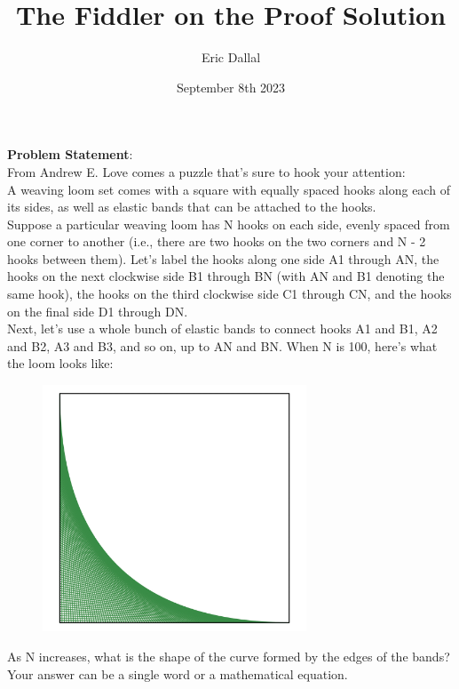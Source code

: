\documentclass[10pt,a4paper]{article}
\title{The Fiddler on the Proof Solution}
\date{September 8th 2023}
\author{Eric Dallal}
\begin{document}
\maketitle
\textbf{Problem Statement}:\\

From Andrew E. Love comes a puzzle that’s sure to hook your attention:\\

A weaving loom set comes with a square with equally spaced hooks along each of its sides, as well as elastic bands that can be attached to the hooks.\\

Suppose a particular weaving loom has N hooks on each side, evenly spaced from one corner to another (i.e., there are two hooks on the two corners and N - 2 hooks between them). Let’s label the hooks along one side A1 through AN, the hooks on the next clockwise side B1 through BN (with AN and B1 denoting the same hook), the hooks on the third clockwise side C1 through CN, and the hooks on the final side D1 through DN.\\

Next, let’s use a whole bunch of elastic bands to connect hooks A1 and B1, A2 and B2, A3 and B3, and so on, up to AN and BN. When N is 100, here’s what the loom looks like:\\
\begin{figure}[h!]
\centering
\includegraphics[width=0.7\textwidth]{Loom}
\end{figure}

As N increases, what is the shape of the curve formed by the edges of the bands? Your answer can be a single word or a mathematical equation.\\
\end{document}
